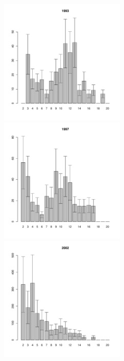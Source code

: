 \documentclass[12pt, a4paper]{article}
\begin{document}
\begin{figure}[h]
\begin{multicols}{3}
\hfill
\includegraphics[width=60mm]{../White_Sea/Luvenga_II_razrez/zostera_zone2_1993_.pdf}
\hfill
\includegraphics[width=60mm]{../White_Sea/Luvenga_II_razrez/zostera_zone2_1997_.pdf}
\hfill
\includegraphics[width=60mm]{../White_Sea/Luvenga_II_razrez/zostera_zone2_2002_.pdf}
\end{multicols}



\end{figure}
\end{document}
